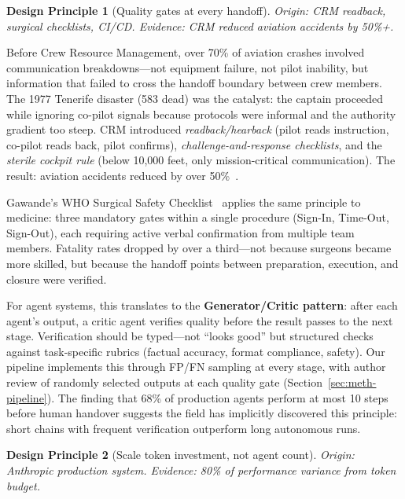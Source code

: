 \documentclass{article}
\newtheorem{principle}{Design Principle}
\begin{document}
\begin{principle}[Quality gates at every handoff]
\emph{Origin}: CRM readback, surgical checklists, CI/CD.
\emph{Evidence}: CRM reduced aviation accidents by 50\%+.
\end{principle}

Before Crew Resource Management, over 70\% of aviation crashes involved communication
breakdowns---not equipment failure, not pilot inability, but information that failed to
cross the handoff boundary between crew members. The 1977 Tenerife disaster (583 dead)
was the catalyst: the captain proceeded while ignoring co-pilot signals because protocols
were informal and the authority gradient too steep. CRM introduced
\emph{readback/hearback} (pilot reads instruction, co-pilot reads back, pilot confirms),
\emph{challenge-and-response checklists}, and the \emph{sterile cockpit rule} (below
10,000 feet, only mission-critical communication). The result: aviation accidents
reduced by over 50\%~\citep{helmreich1999crm}.

Gawande's WHO Surgical Safety Checklist~\citep{gawande2009checklist} applies the same
principle to medicine: three mandatory gates within a single procedure (Sign-In,
Time-Out, Sign-Out), each requiring active verbal confirmation from multiple team
members. Fatality rates dropped by over a third---not because surgeons became more
skilled, but because the handoff points between preparation, execution, and closure were
verified.

For agent systems, this translates to the \textbf{Generator/Critic pattern}: after each
agent's output, a critic agent verifies quality before the result passes to the next
stage. Verification should be typed---not ``looks good'' but structured checks against
task-specific rubrics (factual accuracy, format compliance, safety). Our pipeline
implements this through FP/FN sampling at every stage, with author review of randomly
selected outputs at each quality gate (Section~\ref{sec:meth-pipeline}). The finding
that 68\% of production agents perform at most 10 steps before human handover suggests
the field has implicitly discovered this principle: short chains with frequent
verification outperform long autonomous runs.

\begin{principle}[Scale token investment, not agent count]
\emph{Origin}: Anthropic production system.
\emph{Evidence}: 80\% of performance variance from token budget.
\end{principle}
\end{document}
